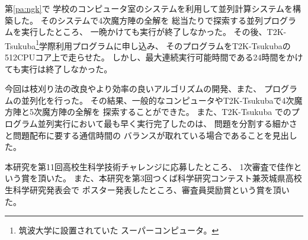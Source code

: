 \def \wrkdir {p.jsec/}

\label{pa:jsec}

第\ref{pa:ngk}\postmpartname{}で
学校のコンピュータ室のシステムを利用して並列計算システムを構築した。
そのシステムで4次魔方陣の全解を
総当たりで探索する並列プログラムを実行したところ、
一晩かけても実行が終了しなかった。
その後、T2K-Tsukuba\footnote{筑波大学に設置されていた
スーパーコンピュータ。}学際利用プログラムに申し込み、
そのプログラムをT2K-Tsukubaの512CPUコア上で走らせた。
しかし、最大連続実行可能時間である24時間をかけても実行は終了しなかった。

今回は枝刈り法の改良やより効率の良いアルゴリズムの開発、また、
プログラムの並列化を行った。
その結果、一般的なコンピュータやT2K-Tsukubaで4次魔方陣と5次魔方陣の全解を
探索することができた。
また、T2K-Tsukuba でのプログラム並列実行において最も早く実行完了したのは、
問題を分割する細かさと問題配布に要する通信時間の
バランスが取れている場合であることを見出した。

本研究を第11回高校生科学技術チャレンジに応募したところ、
1次審査で佳作という賞を頂いた。
また、本研究を第3回つくば科学研究コンテスト兼茨城県高校生科学研究発表会で
ポスター発表したところ、審査員奨励賞という賞を頂いた。
